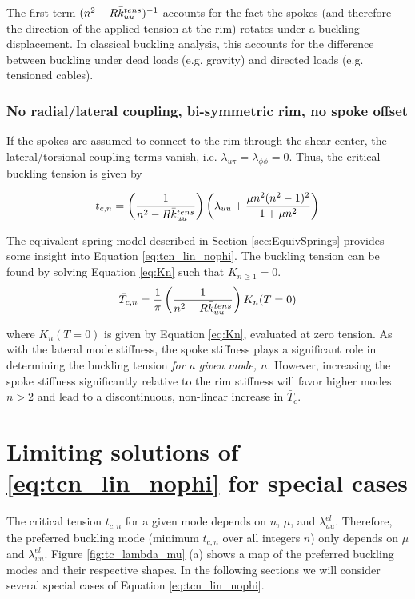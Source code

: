 \documentclass[\rootdir/thesis.tex]{subfiles}
\begin{document}
The first term $(n^2 - R\bar{k}_{uu}^{tens})^{-1}$ accounts for the fact the spokes (and therefore the direction of the applied tension at the rim) rotates under a buckling displacement. In classical buckling analysis, this accounts for the difference between buckling under dead loads (e.g. gravity) and directed loads (e.g. tensioned cables).

\subsubsection{No radial/lateral coupling, bi-symmetric rim, no spoke offset}
If the spokes are assumed to connect to the rim through the shear center, the lateral/torsional coupling terms vanish, i.e. $\lambda_{u\pi}=\lambda_{\phi\phi}=0$. Thus, the critical buckling tension is given by

\begin{equation}
\label{eq:tcn_lin_nophi}
t_{c,n} = \left(\frac{1}{n^2 - R\bar{k}_{uu}^{tens}}\right)
\left(\lambda_{uu}
      +\frac{\mu n^2(n^2-1)^2}
        {1 + \mu n^2}\right)
\end{equation}

The equivalent spring model described in Section \ref{sec:EquivSprings} provides some insight into Equation \eqref{eq:tcn_lin_nophi}. The buckling tension can be found by solving Equation \eqref{eq:Kn} such that $K_{n\geq 1} = 0$.
\begin{equation}
\bar{T}_{c,n} = \frac{1}{\pi}\left(\frac{1}{n^2 - R\bar{k}_{uu}^{tens}}\right) K_n(T=0)
\end{equation}

where $K_n(T=0)$ is given by Equation \eqref{eq:Kn}, evaluated at zero tension. As with the lateral mode stiffness, the spoke stiffness plays a significant role in determining the buckling tension \emph{for a given mode, $n$}. However, increasing the spoke stiffness significantly relative to the rim stiffness will favor higher modes $n > 2$ and lead to a discontinuous, non-linear increase in $\bar{T}_c$.

\section{Limiting solutions of \eqref{eq:tcn_lin_nophi} for special cases}

The critical tension $t_{c,n}$ for a given mode depends on $n$, $\mu$, and $\lambda_{uu}^{el}$. Therefore, the preferred buckling mode (minimum $t_{c,n}$ over all integers $n$) only depends on $\mu$ and $\lambda_{uu}^{el}$. Figure \ref{fig:tc_lambda_mu} (a) shows a map of the preferred buckling modes and their respective shapes. In the following sections we will consider several special cases of Equation \eqref{eq:tcn_lin_nophi}.
\end{document}
